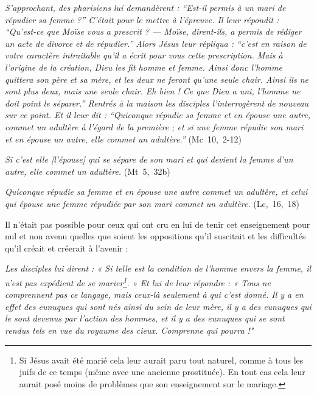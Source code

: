 \begin{displayquote}
\emph{S'approchant, des pharisiens lui demandèrent : \enquote{Est-il permis à un mari de répudier sa femme ?} C'était pour le mettre à l'épreuve. Il leur répondit : \enquote{Qu'est-ce que Moïse vous a prescrit ? --- Moïse, dirent-ils, a permis de rédiger un acte de divorce et de répudier.} Alors Jésus leur répliqua : \enquote{c'est en raison de votre caractère intraitable qu'il a écrit pour vous cette prescription. Mais à l'origine de la création, Dieu les fit homme et femme. Ainsi donc l'homme quittera son père et sa mère, et les deux ne feront qu'une seule chair. Ainsi ils ne sont plus deux, mais une seule chair. Eh bien ! Ce que Dieu a uni, l'homme ne doit point le séparer.} Rentrés à la maison les disciples l'interrogèrent de nouveau sur ce point. Et il leur dit : \enquote{Quiconque répudie sa femme et en épouse une autre, commet un adultère à l'égard de la première ; et si une femme répudie son mari et en épouse un autre, elle commet un adultère.}} (Mc~10,~2-12)

{\emph{Si c'est elle \emph{[l'épouse]} qui se sépare de son mari et qui devient la femme d'un autre, elle commet un adultère.}} (Mt~5,~32b)

{\emph{Quiconque répudie sa femme et en épouse une autre commet un adultère, et celui qui épouse une femme répudiée par son mari commet un adultère.}} (Lc,~16,~18)
 \end{displayquote} 

  Il n'était pas possible pour ceux qui ont cru en lui de tenir cet enseignement pour nul et non avenu quelles que soient les oppositions qu'il suscitait et les difficultés qu'il créait et créerait à l'avenir :

\begin{displayquote}[Mt~19,~10-12]
\emph{Les disciples lui dirent : « Si telle est la condition de l'homme envers la femme, il n'est pas expédient de se marier\footnote{Si Jésus avait été marié  cela leur aurait paru tout naturel, comme à tous les juifs de ce temps (même avec une ancienne prostituée). En tout cas cela leur aurait posé moins de problèmes que son enseignement sur le mariage.}. » Et lui de leur répondre : « Tous ne comprennent pas ce langage, mais ceux-là seulement à qui c'est donné. Il y a en effet des eunuques qui sont nés ainsi du sein de leur mère, il y a des eunuques qui le sont devenus par l'action des hommes, et il y a des eunuques qui se sont rendus tels en vue du royaume des cieux. Comprenne qui pourra !"}
\end{displayquote}
 
